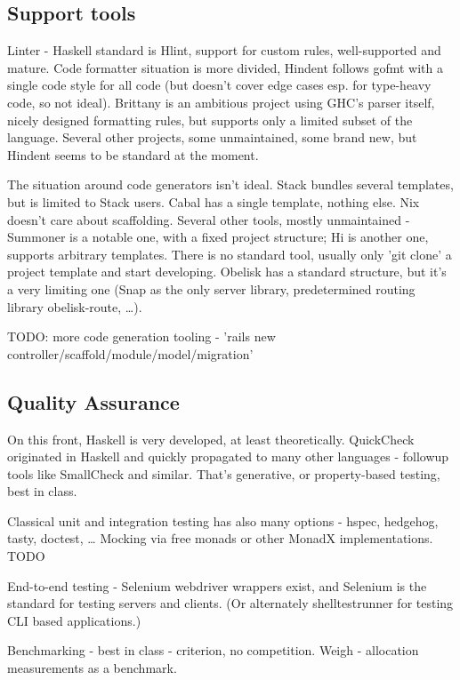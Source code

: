 \documentclass[english,odsaz]{fitthesis}
\begin{document}
\subsection{Support tools}
\label{sec:orgfe6a32e}
Linter - Haskell standard is Hlint, support for custom rules, well-supported and
mature. Code formatter situation is more divided, Hindent follows gofmt with a
single code style for all code (but doesn't cover edge cases esp. for type-heavy
code, so not ideal). Brittany is an ambitious project using GHC's parser itself,
nicely designed formatting rules, but supports only a limited subset of the
language. Several other projects, some unmaintained, some brand new, but Hindent
seems to be standard at the moment.

The situation around code generators isn't ideal. Stack bundles several
templates, but is limited to Stack users. Cabal has a single template, nothing
else. Nix doesn't care about scaffolding. Several other tools, mostly
unmaintained - Summoner is a notable one, with a fixed project structure; Hi is
another one, supports arbitrary templates. There is no standard tool, usually
only 'git clone' a project template and start developing. Obelisk has a standard
structure, but it's a very limiting one (Snap as the only server library,
predetermined routing library obelisk-route, \ldots{}).

TODO: more code generation tooling - 'rails new
controller/scaffold/module/model/migration'

\subsection{Quality Assurance}
\label{sec:org88b1d3c}
On this front, Haskell is very developed, at least theoretically. QuickCheck
originated in Haskell and quickly propagated to many other languages - followup
tools like SmallCheck and similar. That's generative, or property-based testing,
best in class.

Classical unit and integration testing has also many options - hspec, hedgehog,
tasty, doctest, \ldots{} Mocking via free monads or other MonadX
implementations. TODO

End-to-end testing - Selenium webdriver wrappers exist, and Selenium is the
standard for testing servers and clients. (Or alternately shelltestrunner for
testing CLI based applications.)

Benchmarking - best in class - criterion, no competition. Weigh - allocation
measurements as a benchmark.
\end{document}
